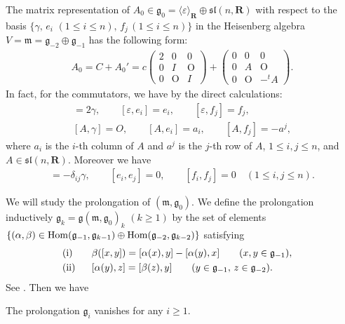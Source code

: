 The matrix representation of $A_0 \in \mathfrak{g}_0=\langle\varepsilon\rangle_{{\mathbf{R}}} \oplus {\mathfrak{sl}}(n, {\mathbf{R}})$
with respect to the basis $\{ \gamma, \, e_i $ $(1 \leq i \leq n),\,   f_j\,  (1 \leq i \leq n) \}$ in
the Heisenberg algebra
$V= \mathfrak{m} = \mathfrak{g}_{-2}\oplus \mathfrak{g}_{-1}$
has the following form:
\begin{gather*}
A_0=C+A_0'=
 c
\begin{pmatrix}
2 & 0 & 0 \\
0 & I & \mathrm{O} \\
0 & \mathrm{O} & I
\end{pmatrix}
+
\begin{pmatrix}
0 & 0 & 0 \\
0 & A & \mathrm{O} \\
0 & \mathrm{O} & -{}^t\!A
\end{pmatrix}.
\end{gather*}
In fact, for the commutators, we have by the direct calculations:
\begin{gather*}
[\varepsilon, \gamma] = 2\gamma,
\qquad
[\varepsilon, e_i] = e_i,
\qquad
[\varepsilon, f_j] = f_j,
\\
[A, \gamma] = O,
\qquad
[A, e_i] = a_i,
\qquad
[A, f_j] = - a^j,
\end{gather*}
where $a_i$ is the $i$-th column of $A$ and $a^j$ is the $j$-th row of $A$,
$1 \leq i, j \leq n$, and $A \in {\mathfrak{sl}}(n, {\mathbf{R}})$.
Moreover we have
\begin{gather*}
[e_i, f_j] = - \delta_{ij}\gamma, \qquad [e_i, e_j] = 0, \qquad [f_i, f_j] = 0 \quad (1 \leq i, j \leq n).
\end{gather*}

We will study the prolongation of
$({\mathfrak m}, {\mathfrak g}_0)$.
We def\/ine the prolongation inductively
${\mathfrak g}_k = {\mathfrak g}({\mathfrak m}, {\mathfrak g}_0)_k$ $(k \geq 1)$ by
the set of elements
$\{
(\alpha, \beta) \in  {\rm Hom}({\mathfrak g}_{-1}, {\mathfrak g}_{k-1})\oplus
{\rm Hom}({\mathfrak g}_{-2}, {\mathfrak g}_{k-2})\}$ satisfying
\begin{alignat*}{3}
& {\rm (i)} \ \ && \beta([x, y]) = [\alpha(x), y] - [\alpha(y), x]   \qquad (x, y \in {\mathfrak g}_{-1}), &
\\
& {\rm (ii)} \ \ && [\alpha(y), z] = [\beta(z), y]  \qquad (y \in {\mathfrak g}_{-1},\, z \in {\mathfrak g}_{-2}).&
\end{alignat*}
See \cite[p.~429]{Y}. Then we have

\begin{Lem}
\label{prolongation-calculation}
The prolongation ${\mathfrak g}_i$ vanishes for any $i \geq 1$.
\end{Lem}


